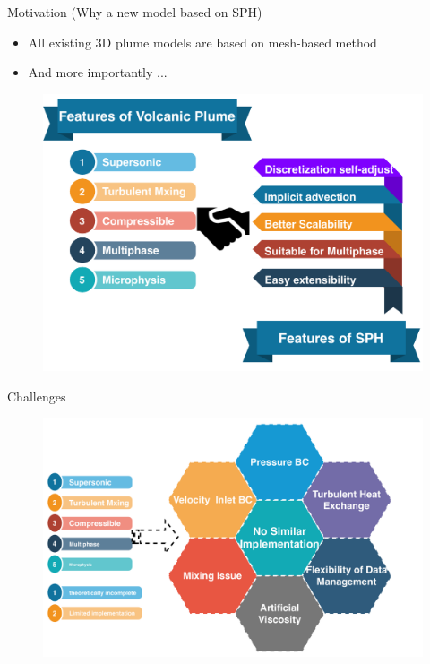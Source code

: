 \documentclass{beamer}
\begin{document}
\begin{frame}{Motivation (Why a new model based on SPH)}
\begin{itemize}
\item All existing 3D plume models are based on mesh-based method
\item And more importantly ...
\end{itemize}

\begin{figure}
\centering
\includegraphics[width=.75\textwidth]{./PPT/Why_SPH}
\end{figure}
\end{frame}

\begin{frame}{Challenges}
\noindent
\begin{figure}
\centering
\includegraphics[width=.95\textwidth]{./PPT/Challenges}
\end{figure}
\end{frame}
\end{document}
